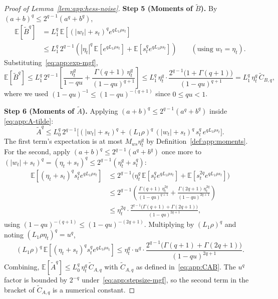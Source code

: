 \documentclass{article}
\theoremstyle{plain}
\theoremstyle{definition}
\theoremstyle{remark}
\begin{document}
\begin{proof}[Proof of Lemma~\ref{lem:app:hess-noise}]
\smallskip\noindent\textbf{Step 5 (Moments of $\widetilde B$).}
By $(a+b)^q \leq 2^{q-1}(a^q + b^q)$,
\begin{align*}
  \mathbb{E}[\widetilde B^q]
  &= L_1^q\, \mathbb{E}\!\left[(|w_t|+s_t)^q e^{qL_1\rho s_t}\right]
  \\
  &\leq L_1^q\, 2^{q-1}\!\left(|\eta_t|^q\, \mathbb{E}[e^{qL_1\rho s_t}]
      + \mathbb{E}[s_t^q e^{qL_1\rho s_t}]\right)
  \qquad (\text{using } w_t = \eta_t).
\end{align*}
Substituting~\eqref{eq:app:exp-mgf},
\[
  \mathbb{E}[\widetilde B^q]
  \leq L_1^q\, 2^{q-1}\!\left[\frac{\eta_t^q}{1-qu}
    + \frac{\Gamma(q+1)\, \eta_t^q}{(1-qu)^{q+1}}\right]
  \leq L_1^q\, \eta_t^q\cdot
    \frac{2^{q-1}\bigl(1 + \Gamma(q+1)\bigr)}{(1-qu)^{q+1}}
  = L_1^q\, \eta_t^q\, \widetilde C_{B,q},
\]
where we used $(1-qu)^{-1} \leq (1-qu)^{-(q+1)}$ since $0 \leq qu < 1$.

\smallskip\noindent\textbf{Step 6 (Moments of $\widetilde A$).}
Applying $(a+b)^q \leq 2^{q-1}(a^q + b^q)$ inside
\eqref{eq:app:A-tilde}:
\[
  \widetilde A^q
  \leq L_0^q\, 2^{q-1}\bigl[(|w_t|+s_t)^q
    + (L_1\rho)^q\, (|w_t|+s_t)^q\, s_t^q\, e^{qL_1\rho s_t}\bigr].
\]
The first term's expectation is at most $M_{ws}\eta_t^q$ by
Definition~\ref{def:app:moments}. For the second, apply $(a+b)^q \leq
2^{q-1}(a^q+b^q)$ once more to $(|w_t|+s_t)^q = (\eta_t + s_t)^q \leq
2^{q-1}(\eta_t^q + s_t^q)$:
\begin{align*}
  \mathbb{E}\!\left[(\eta_t + s_t)^q s_t^q e^{qL_1\rho s_t}\right]
  &\leq 2^{q-1}\bigl(\eta_t^q\, \mathbb{E}[s_t^q e^{qL_1\rho s_t}]
    + \mathbb{E}[s_t^{2q} e^{qL_1\rho s_t}]\bigr)
  \\
  &\leq 2^{q-1}\!\left(\frac{\Gamma(q+1)\,\eta_t^{2q}}{(1-qu)^{q+1}}
    + \frac{\Gamma(2q+1)\,\eta_t^{2q}}{(1-qu)^{2q+1}}\right)
  \\
  &\leq \eta_t^{2q}\cdot
    \frac{2^{q-1}\bigl(\Gamma(q+1) + \Gamma(2q+1)\bigr)}{(1-qu)^{2q+1}},
\end{align*}
using $(1-qu)^{-(q+1)} \leq (1-qu)^{-(2q+1)}$. Multiplying by $(L_1\rho)^q$
and noting $(L_1\rho\eta_t)^q = u^q$,
\[
  (L_1\rho)^q\, \mathbb{E}\!\left[(\eta_t + s_t)^q s_t^q e^{qL_1\rho s_t}\right]
  \leq \eta_t^q \cdot u^q \cdot
    \frac{2^{q-1}\bigl(\Gamma(q+1) + \Gamma(2q+1)\bigr)}{(1-qu)^{2q+1}}.
\]
Combining, $\mathbb{E}[\widetilde A^q] \leq L_0^q\, \eta_t^q\, \widetilde
C_{A,q}$ with $\widetilde C_{A,q}$ as defined in~\eqref{eq:app:CAB}. The
$u^q$ factor is bounded by $2^{-q}$ under~\eqref{eq:app:stepsize-mgf}, so
the second term in the bracket of $\widetilde C_{A,q}$ is a numerical
constant.


\end{proof}
\end{document}
